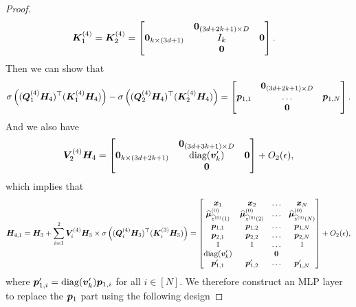 \begin{proof}
\begin{align*}
    \boldsymbol{K}_1^{(4)}&=\boldsymbol{K}_2^{(4)}=\begin{bmatrix}
        &\boldsymbol{0}_{(3d+2k+1)\times D}&\\
        \boldsymbol{0}_{k\times (3d+1)}&I_k&\boldsymbol{0}\\
        &\boldsymbol{0}&
    \end{bmatrix}.
\end{align*}
Then we can show that
\begin{align*}
    \sigma\left((\boldsymbol{Q}_1^{(4)}\boldsymbol{H}_4)^\top(\boldsymbol{K}_1^{(4)}\boldsymbol{H}_4)\right)-\sigma\left((\boldsymbol{Q}_2^{(4)}\boldsymbol{H}_4)^\top(\boldsymbol{K}_2^{(4)}\boldsymbol{H}_4)\right) = \begin{bmatrix}
        &\boldsymbol{0}_{(3d+2k+1)\times D}&\\
        \boldsymbol{p}_{1,1}&\ldots&\boldsymbol{p}_{1,N}\\
        &\boldsymbol{0}
    \end{bmatrix}.
\end{align*}
And we also have
\begin{align*}
    \boldsymbol{V}_2^{(4)}\boldsymbol{H}_4 = \begin{bmatrix}
        &\boldsymbol{0}_{(3d+3k+1)\times D}&\\
        \boldsymbol{0}_{k\times(3d+2k+1)}&\text{diag}(\boldsymbol{v}_k^\prime) &\boldsymbol{0}\\
        &\boldsymbol{0}&
\end{bmatrix}+O_2(\epsilon),
\end{align*}
which implies that
\begin{align*}
    \boldsymbol{H}_{4,1} = \boldsymbol{H}_3+\sum_{i=1}^2\boldsymbol{V}_i^{(4)}\boldsymbol{H}_3\times\sigma\left((\boldsymbol{Q}_i^{(4)}\boldsymbol{H}_3)^\top(\boldsymbol{K}_i^{(3)}\boldsymbol{H}_3)\right)=\begin{bmatrix}
        \boldsymbol{x}_1&\boldsymbol{x}_2&\ldots&\boldsymbol{x}_N\\
        \widehat{\boldsymbol{\mu}}_{\widehat{z}^{(0)}(1)}^{(0)}&\widehat{\boldsymbol{\mu}}_{\widehat{z}^{(0)}(2)}^{(0)}&\ldots&\widehat{\boldsymbol{\mu}}_{\widehat{z}^{(0)}(N)}^{(0)}\\
        \boldsymbol{p}_{1,1}&\boldsymbol{p}_{1,2}&\ldots&\boldsymbol{p}_{1,N}\\
        \boldsymbol{p}_{2,1}&\boldsymbol{p}_{2,2}&\ldots&\boldsymbol{p}_{2,N}\\
        1&1&\ldots&1\\
        \text{diag}(\boldsymbol{v}_k^\prime)&&\boldsymbol{0}&\\
        \boldsymbol{p}_{1,1}^\prime&\boldsymbol{p}_{1,2}^\prime&\ldots&\boldsymbol{p}_{1,N}^\prime
    \end{bmatrix}+O_{2}(\epsilon),
\end{align*}
where $\boldsymbol{p}_{1,i}^\prime = \text{diag}(\boldsymbol{v}_k^\prime)\boldsymbol{p}_{1,i}$ for all $i\in[N]$. We therefore construct an MLP layer to replace the $\boldsymbol{p}_{1}$ part using the following design

\end{proof}
